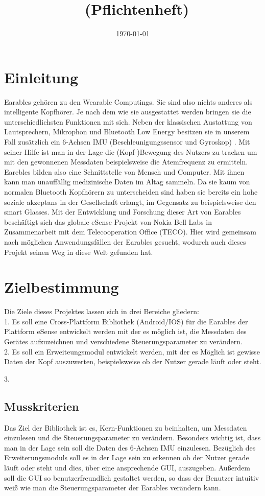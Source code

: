 \documentclass[a4paper,12pt]{article}
\title{\projektName~(Pflichtenheft)}
\author{\authorName}
\date{\today}
\begin{document}
 \setcounter{page}{2}
 \tableofcontents          %
 \clearpage

\section{Einleitung}
Earables gehören zu den Wearable Computings. Sie sind also nichts anderes als intelligente Kopfhörer. Je nach dem wie sie ausgestattet werden bringen sie die unterschiedlichsten Funktionen mit sich. Neben der klassischen Austattung von  Lautsprechern, Mikrophon und Bluetooth Low Energy besitzen sie in unserem Fall zusätzlich ein 6-Achsen IMU (Beschleunigungssensor und Gyroskop) . Mit seiner Hilfe ist man in der Lage die (Kopf-)Bewegung des Nutzers zu tracken um mit den gewonnenen Messdaten  beispielsweise die Atemfrequenz zu ermitteln. Earebles bilden also eine Schnittstelle von Mensch und Computer. Mit ihnen kann man unauffällig medizinische Daten im Altag sammeln. Da sie kaum von normalen Bluetooth Kopfhörern zu unterscheiden sind haben sie bereits ein hohe soziale akzeptans in der Gesellschaft erlangt, im Gegensatz zu beispielsweise den smart Glasses. Mit der Entwicklung und Forschung dieser Art von Earables beschäftigt sich das globale eSense Projekt von Nokia Bell Labs in Zusammenarbeit mit dem Telecooperation Office (TECO). Hier wird gemeinsam nach möglichen Anwendungsfällen der Earables gesucht, wodurch auch dieses Projekt seinen Weg in diese Welt gefunden hat.
\section{Zielbestimmung}
Die Ziele dieses Projektes lassen sich in drei Bereiche gliedern:\\

1. Es soll eine Cross-Plattform Bibliothek (Android/IOS)  für die Earables der Plattform eSense entwickelt werden mit der es möglich ist, die Messdaten des Gerätes aufzuzeichnen und verschiedene Steuerungsparameter zu verändern.\\

2. Es soll ein Erweiteungsmodul entwickelt werden, mit der es Möglich ist gewisse Daten der Kopf auszuwerten, beispielsweise ob der Nutzer gerade läuft oder steht.

3. %
\subsection{Musskriterien}
Das Ziel der Bibliothek ist es, Kern-Funktionen zu beinhalten, um Messdaten einzulesen und die Steuerungsparameter zu verändern. Besonders wichtig ist, dass man in der Lage sein soll die Daten des 6-Achsen IMU einzulesen. Bezüglich des Erweiterungsmoduls soll es in der Lage sein zu erkennen ob der Nutzer gerade läuft oder steht und dies, über eine ansprechende GUI, auszugeben. Außerdem soll die GUI so benutzerfreundlich gestaltet werden, so dass der Benutzer intuitiv weiß wie man die Steuerungsparameter der Earables verändern kann.
\end{document}
